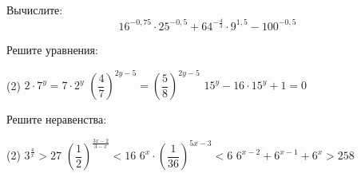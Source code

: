 \begin{homework}[number=2]
	\begin{listofex}
		\item Вычислите: %
		\[ 16^{-0,75} \cdot 25^{-0,5}+64^{-\tfrac{4}{3}} \cdot 9^{1,5} - 100^{-0,5} \]
		\item Решите уравнения: %
		\begin{tasks}(2)
			\task \( 2 \cdot 7^y = 7 \cdot 2^y \)
			\task \( \left( \dfrac{ 4 }{ 7 } \right)^{2y-5} = \left( \dfrac{  5}{8  } \right)^{2y-5} \)
			\task \( 15^y - 16 \cdot 15^y + 1 = 0 \)
		\end{tasks}
		\item Решите неравенства: %
		\begin{tasks}(2)
			\task \( 3^{\tfrac{4}{x}} > 27 \)
			\task \( \left( \dfrac{ 1 }{ 2 } \right)^{\tfrac{ 3x-2 }{ 3-x }} < 16 \)
			\task \( 6^x \cdot \left( \dfrac{ 1 }{36  } \right)^{5x-3} < 6 \)
			\task \( 6^{x-2} + 6^{x-1}+6^x > 258 \)
		\end{tasks}
		
		
	\end{listofex}
\end{homework}

